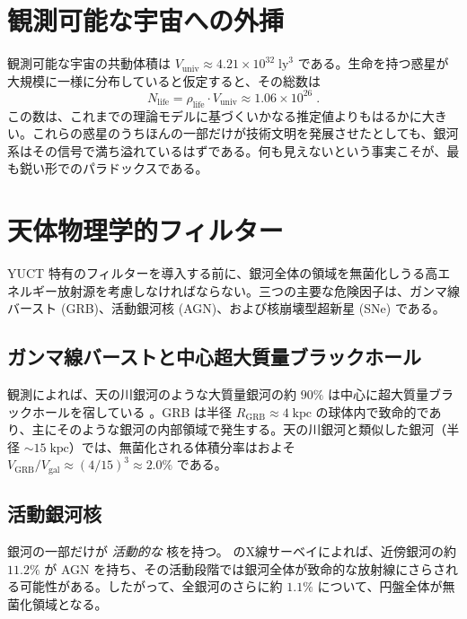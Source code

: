 \documentclass[11pt,a4paper]{article}
\begin{document}
	\section{観測可能な宇宙への外挿}
	\label{sec:extrapolation}
	観測可能な宇宙の共動体積は \(V_{\mathrm{univ}} \approx 4.21\times 10^{32}\;\mathrm{ly}^{3}\) である。生命を持つ惑星が大規模に一様に分布していると仮定すると、その総数は
	\begin{equation}
		\label{eq:N_life_total}
		N_{\mathrm{life}} = \rho_{\mathrm{life}} \cdot V_{\mathrm{univ}}
		\approx 1.06\times 10^{26}\; .
	\end{equation}
	この数は、これまでの理論モデルに基づくいかなる推定値よりもはるかに大きい。これらの惑星のうちほんの一部だけが技術文明を発展させたとしても、銀河系はその信号で満ち溢れているはずである。何も見えないという事実こそが、最も鋭い形でのパラドックスである。
	
	\section{天体物理学的フィルター}
	\label{sec:astro_filters}
	YUCT 特有のフィルターを導入する前に、銀河全体の領域を無菌化しうる高エネルギー放射源を考慮しなければならない。三つの主要な危険因子は、ガンマ線バースト (GRB)、活動銀河核 (AGN)、および核崩壊型超新星 (SNe) である。
	
	\subsection{ガンマ線バーストと中心超大質量ブラックホール}
	\label{sec:grb}
	観測によれば、天の川銀河のような大質量銀河の約 \(90\%\) は中心に超大質量ブラックホールを宿している \citep{Chandra2025}。GRB は半径 \(R_{\mathrm{GRB}} \approx 4\;\mathrm{kpc}\) の球体内で致命的であり、主にそのような銀河の内部領域で発生する。天の川銀河と類似した銀河（半径 \(\sim 15\;\mathrm{kpc}\)）では、無菌化される体積分率はおよそ \(V_{\mathrm{GRB}}/V_{\mathrm{gal}} \approx (4/15)^{3} \approx 2.0\%\) である。
	
	\subsection{活動銀河核}
	\label{sec:agn}
	銀河の一部だけが \emph{活動的な} 核を持つ。\citet{Foord2017} のX線サーベイによれば、近傍銀河の約 \(11.2\%\) が AGN を持ち、その活動段階では銀河全体が致命的な放射線にさらされる可能性がある。したがって、全銀河のさらに約 \(1.1\%\) について、円盤全体が無菌化領域となる。
	
\end{document}
